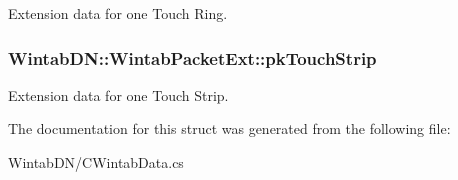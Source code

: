 Extension data for one Touch Ring. 

\hypertarget{struct_wintab_d_n_1_1_wintab_packet_ext_a55c86bdd1cd442ecba1b61ccc1d4dfe8}{
\subsubsection[{pkTouchStrip}]{ {\bf WintabDN::WintabPacketExt::pkTouchStrip}}}
\label{struct_wintab_d_n_1_1_wintab_packet_ext_a55c86bdd1cd442ecba1b61ccc1d4dfe8}


Extension data for one Touch Strip. 



The documentation for this struct was generated from the following file:\begin{DoxyCompactItemize}
\item 
WintabDN/CWintabData.cs\end{DoxyCompactItemize}
